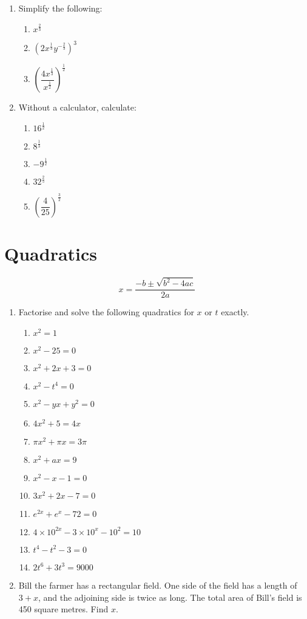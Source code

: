 \documentclass{amsbook}
\begin{document}
\begin{enumerate}
  \item Simplify the following:
    \begin{enumerate}
      \item $ x^\frac{2}{3} $
      \item $ \left(2x^\frac{1}{3} y^{-\frac{2}{3}}\right)^3 $
      \item $ \left( \dfrac{4x^\frac{1}{3}}{x^\frac{1}{2}} \right)^\frac{1}{2} $
    \end{enumerate}
  \item Without a calculator, calculate:
    \begin{enumerate}
      \item $ 16^\frac{1}{2} $
      \item $ 8^\frac{1}{3} $
      \item $ -9^\frac{1}{2} $
      \item $ 32^\frac{2}{5} $
      \item $ \left( \dfrac{4}{25} \right)^\frac{3}{2} $
    \end{enumerate}
\end{enumerate}

\section{Quadratics}
\begin{displaymath}
  x = \frac{-b \pm \sqrt{b^2 - 4ac}}{2a}
\end{displaymath}

\begin{enumerate}
  \item Factorise and solve the following quadratics for $ x $ or $ t $ exactly.
  \begin{enumerate}
    \item $ x^2 = 1 $
    \item $ x^2 - 25 = 0 $
    \item $ x^2 + 2x + 3 = 0 $
    \item $ x^2 - t^4 = 0 $
    \item $ x^2 - yx + y^2 = 0 $
    \item $ 4x^2 + 5 = 4x $
    \item $ \pi x^2 + \pi x = 3\pi $
    \item $ x^2 + ax = 9 $
    \item $ x^2 - x - 1 = 0 $
    \item $ 3x^2 + 2x - 7 = 0 $
    \item $ e^{2x} + e^{x} - 72 = 0 $
    \item $ 4\times 10^{2x} - 3 \times 10^{x} - 10^2 = 10 $
    \item $ t^4 - t^2 - 3 = 0 $
    \item $ 2t^6 + 3t^3 = 9000 $
  \end{enumerate}
  \item Bill the farmer has a rectangular field. One side of the field has a length of $ 3 + x $, and the adjoining side is twice as long. The
        total area of Bill's field is 450 square metres. Find $ x $.
\end{enumerate}
\end{document}
